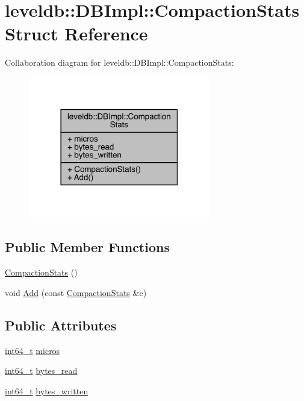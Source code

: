 \hypertarget{structleveldb_1_1_d_b_impl_1_1_compaction_stats}{}\section{leveldb\+:\+:D\+B\+Impl\+:\+:Compaction\+Stats Struct Reference}
\label{structleveldb_1_1_d_b_impl_1_1_compaction_stats}


Collaboration diagram for leveldb\+:\+:D\+B\+Impl\+:\+:Compaction\+Stats\+:\nopagebreak
\begin{figure}[H]
\begin{center}
\leavevmode
\includegraphics[width=225pt]{structleveldb_1_1_d_b_impl_1_1_compaction_stats__coll__graph}
\end{center}
\end{figure}
\subsection*{Public Member Functions}
\begin{DoxyCompactItemize}
\item 
\hyperlink{structleveldb_1_1_d_b_impl_1_1_compaction_stats_ab6367655de4bef0c2c2eb38c4a6c0b29}{Compaction\+Stats} ()
\item 
void \hyperlink{structleveldb_1_1_d_b_impl_1_1_compaction_stats_ae368f762a8b5d59e727faa94f393b7f0}{Add} (const \hyperlink{structleveldb_1_1_d_b_impl_1_1_compaction_stats}{Compaction\+Stats} \&c)
\end{DoxyCompactItemize}
\subsection*{Public Attributes}
\begin{DoxyCompactItemize}
\item 
\hyperlink{stdint_8h_adec1df1b8b51cb32b77e5b86fff46471}{int64\+\_\+t} \hyperlink{structleveldb_1_1_d_b_impl_1_1_compaction_stats_a7c64b7eadf84a5e4a5ff6482df7cefa1}{micros}
\item 
\hyperlink{stdint_8h_adec1df1b8b51cb32b77e5b86fff46471}{int64\+\_\+t} \hyperlink{structleveldb_1_1_d_b_impl_1_1_compaction_stats_a695c4b05f9ba991f2a5fa4fd801dbf53}{bytes\+\_\+read}
\item 
\hyperlink{stdint_8h_adec1df1b8b51cb32b77e5b86fff46471}{int64\+\_\+t} \hyperlink{structleveldb_1_1_d_b_impl_1_1_compaction_stats_a8a2b2fde9bec83da2a82b6981dfc036d}{bytes\+\_\+written}
\end{DoxyCompactItemize}


